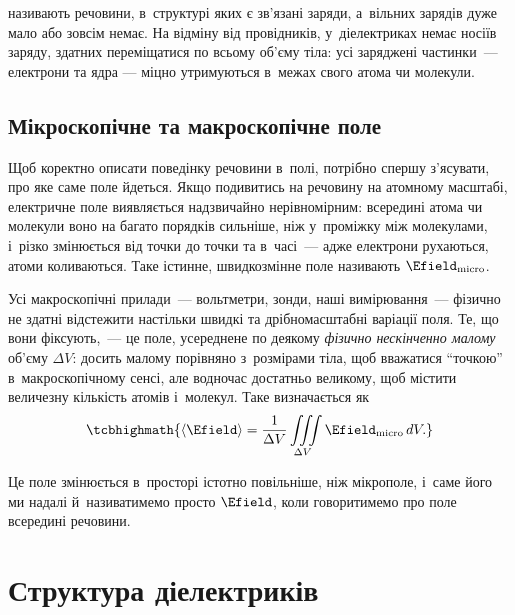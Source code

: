 \begin{Attention}
	 називають речовини, в~структурі яких є зв'язані заряди,
	а~вільних зарядів дуже мало або зовсім немає. На відміну від провідників,
	у~діелектриках немає носіїв заряду, здатних переміщатися по всьому об'єму тіла: усі
	заряджені частинки~--- електрони та ядра --- міцно утримуються в~межах свого атома чи
	молекули.
\end{Attention}


\subsection*{Мікроскопічне та макроскопічне поле}


Щоб коректно описати поведінку речовини в~полі, потрібно спершу з'ясувати, про яке саме
поле йдеться. Якщо подивитись на речовину на атомному масштабі, електричне поле
виявляється надзвичайно нерівномірним: всередині атома чи молекули воно на багато порядків
сильніше, ніж у~проміжку між молекулами, і~різко змінюється від точки до точки та
в~часі~--- адже електрони рухаються, атоми коливаються. Таке істинне, швидкозмінне поле
називають  $\Efield_\text{micro}$.

Усі макроскопічні прилади~--- вольтметри, зонди, наші вимірювання~--- фізично не здатні
відстежити настільки швидкі та дрібномасштабні варіації поля. Те, що вони фіксують,~--- це
поле, усереднене по деякому \emph{фізично нескінченно малому} об'єму $\Delta V$: досить
малому порівняно з~розмірами тіла, щоб вважатися \enquote{точкою} в~макроскопічному сенсі,
але водночас достатньо великому, щоб містити величезну кількість атомів і~молекул. Таке
 визначається як
\begin{equation*}
	\tcbhighmath{
		\left\langle \Efield\right\rangle = \frac1{\Delta V} \iiint\limits_{\Delta V} \Efield_\text{micro}\, dV.
	}
\end{equation*}

Це поле змінюється в~просторі істотно повільніше, ніж мікрополе, і~саме його ми надалі
й~називатимемо просто $\Efield$, коли говоритимемо про поле всередині речовини.


\section{Структура діелектриків}\hypertarget{dielectric-structure}{}


